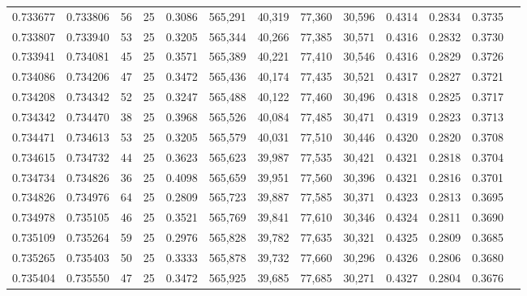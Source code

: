 \begin{tabular}{rrrrrrrrrrrrr}
0.733677 & 0.733806 &    56 &  25 &                                     0.3086 & 565,291 &  40,319 &  77,360 &  30,596 & 0.4314 & 0.2834 & 0.3735 \\
0.733807 & 0.733940 &    53 &  25 &                                     0.3205 & 565,344 &  40,266 &  77,385 &  30,571 & 0.4316 & 0.2832 & 0.3730 \\
0.733941 & 0.734081 &    45 &  25 &                                     0.3571 & 565,389 &  40,221 &  77,410 &  30,546 & 0.4316 & 0.2829 & 0.3726 \\
0.734086 & 0.734206 &    47 &  25 &                                     0.3472 & 565,436 &  40,174 &  77,435 &  30,521 & 0.4317 & 0.2827 & 0.3721 \\
0.734208 & 0.734342 &    52 &  25 &                                     0.3247 & 565,488 &  40,122 &  77,460 &  30,496 & 0.4318 & 0.2825 & 0.3717 \\
0.734342 & 0.734470 &    38 &  25 &                                     0.3968 & 565,526 &  40,084 &  77,485 &  30,471 & 0.4319 & 0.2823 & 0.3713 \\
0.734471 & 0.734613 &    53 &  25 &                                     0.3205 & 565,579 &  40,031 &  77,510 &  30,446 & 0.4320 & 0.2820 & 0.3708 \\
0.734615 & 0.734732 &    44 &  25 &                                     0.3623 & 565,623 &  39,987 &  77,535 &  30,421 & 0.4321 & 0.2818 & 0.3704 \\
0.734734 & 0.734826 &    36 &  25 &                                     0.4098 & 565,659 &  39,951 &  77,560 &  30,396 & 0.4321 & 0.2816 & 0.3701 \\
0.734826 & 0.734976 &    64 &  25 &                                     0.2809 & 565,723 &  39,887 &  77,585 &  30,371 & 0.4323 & 0.2813 & 0.3695 \\
0.734978 & 0.735105 &    46 &  25 &                                     0.3521 & 565,769 &  39,841 &  77,610 &  30,346 & 0.4324 & 0.2811 & 0.3690 \\
0.735109 & 0.735264 &    59 &  25 &                                     0.2976 & 565,828 &  39,782 &  77,635 &  30,321 & 0.4325 & 0.2809 & 0.3685 \\
0.735265 & 0.735403 &    50 &  25 &                                     0.3333 & 565,878 &  39,732 &  77,660 &  30,296 & 0.4326 & 0.2806 & 0.3680 \\
0.735404 & 0.735550 &    47 &  25 &                                     0.3472 & 565,925 &  39,685 &  77,685 &  30,271 & 0.4327 & 0.2804 & 0.3676 \\

\end{tabular}
